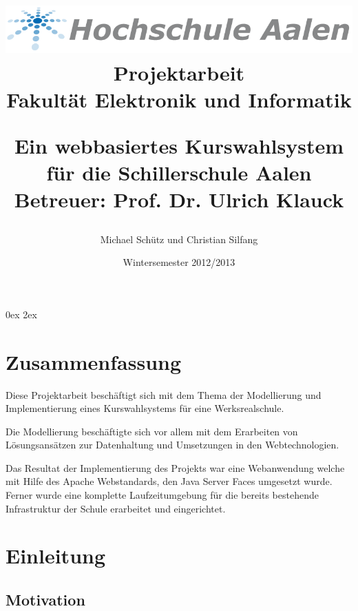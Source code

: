 \documentclass[12pt, twoside, a4paper, ngerman]{article}
\title{
	\begin{center}
		\Huge{\includegraphics[scale=0.5]{img/logo_htw_aalen.png}}\\
		\large{Projektarbeit}\\
		\large{Fakultät Elektronik und Informatik}\\
	\end{center}
	\vspace{3cm}
	\begin{center}
		\Huge{Ein webbasiertes Kurswahlsystem für die Schillerschule Aalen}\\
		\vspace{1.5cm}
		\large{Betreuer: Prof. Dr. Ulrich Klauck}
		\vfill
	\end{center}
}
\author{Michael Schütz und Christian Silfang}
\date{\Huge{Wintersemester 2012/2013}}
\begin{document}
	\parindent0ex
	\parskip2ex
	
	\listoftodos
	\newpage
	
	\pagestyle{empty}
	\maketitle
	\thispagestyle{empty}
	\cleardoublepage
	\newpage
	
	\vspace{10cm}
	\section*{Zusammenfassung}
	
	\pagestyle{fancy}
	\renewcommand{\sectionmark}[1]{\markboth{#1}{}}
	\fancyhf{}
	\fancyhead[L]{ { }\leftmark}
	\fancyhead[R]{\thepage}
	\renewcommand{\headrulewidth}{0.4pt}
	
	
Diese Projektarbeit beschäftigt sich mit dem Thema der Modellierung und Implementierung 
eines Kurswahlsystems für eine Werksrealschule.

Die Modellierung beschäftigte sich vor allem mit dem Erarbeiten von Lösungsansätzen zur Datenhaltung und Umsetzungen in den Webtechnologien.

Das Resultat der Implementierung des Projekts war eine Webanwendung welche mit Hilfe des Apache Webstandards, den Java Server Faces
umgesetzt wurde.
Ferner wurde eine komplette Laufzeitumgebung für die bereits bestehende Infrastruktur der Schule erarbeitet und eingerichtet.
	\cleardoublepage
	
	\newpage
	\tableofcontents
	\cleardoublepage
	
	\printnomenclature
	\cleardoublepage
	\pagestyle{fancy}
	\renewcommand{\sectionmark}[1]{\markboth{#1}{}}
	\fancyhf{}
	\fancyhead[EL]{\thesection { }\leftmark}
	\fancyhead[OR]{{ }\rightmark}
	\renewcommand{\headrulewidth}{0.4pt}
	
%   
  	\fancyfoot[EL]{\textbf{\thepage}}
	\fancyfoot[OR]{\textbf{\thepage}} 
% 	
	
	\setcounter{page}{1}

\section{Einleitung}

\subsection{Motivation}
\end{document}
